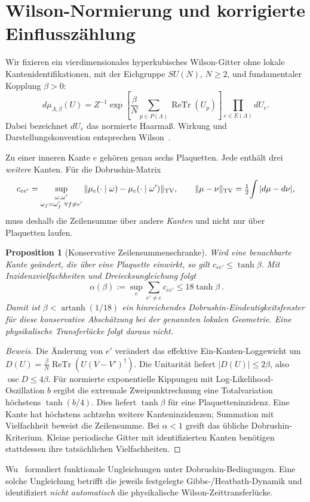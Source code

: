 \documentclass[11pt,a4paper]{article}
\newtheorem{proposition}[theorem]{Proposition}
\theoremstyle{remark}
\begin{document}
\section{Wilson-Normierung und korrigierte Einflusszählung}
Wir fixieren ein vierdimensionales hyperkubisches Wilson-Gitter
ohne lokale Kantenidentifikationen, mit der Eichgruppe
$SU(N)$, $N\ge2$, und fundamentaler Kopplung $\beta>0$:
\[
d\mu_{\Lambda,\beta}(U)=
Z^{-1}\exp\left[
  \frac{\beta}{N}\sum_{p\in P(\Lambda)}
      \operatorname{ReTr}(U_p)
\right]\prod_{e\in E(\Lambda)}dU_e.
\]
Dabei bezeichnet $dU_e$ das normierte Haarmaß.
Wirkung und Darstellungskonvention entsprechen
Wilson~\cite{Wilson}.

Zu einer inneren Kante $e$ gehören genau sechs Plaquetten.
Jede enthält drei \emph{weitere} Kanten.
Für die Dobrushin-Matrix
\[
c_{ee'}=\sup_{\substack{\omega,\omega'\\
\omega_f=\omega'_f\ \forall f\ne e'}}
\|\mu_e(\cdot\mid\omega)-\mu_e(\cdot\mid\omega')\|_{\rm TV},
\qquad
\|\mu-\nu\|_{\rm TV}=\tfrac12\!\int|d\mu-d\nu|,
\]
muss deshalb die Zeilensumme über andere \emph{Kanten}
und nicht nur über Plaquetten laufen.

\begin{proposition}[Konservative Zeilensummenschranke]\label{prop:count}
Wird eine benachbarte Kante geändert, die über eine Plaquette
einwirkt, so gilt $c_{ee'}\le\tanh\beta$.
Mit Inzidenzvielfachheiten und Dreiecksungleichung folgt
\[
\boxed{\ \alpha(\beta):=\sup_e\sum_{e'\ne e}c_{ee'}
\le18\tanh\beta\ }.
\]
Damit ist $\beta<\operatorname{artanh}(1/18)$ ein hinreichendes
\emph{Dobrushin-Eindeutigkeitsfenster} für diese konservative
Abschätzung bei der genannten lokalen Geometrie.
Eine physikalische Transferlücke folgt daraus nicht.
\end{proposition}
\begin{proof}[Beweis]
Die Änderung von $e'$ verändert das effektive
Ein-Kanten-Loggewicht um
$D(U)=\frac{\beta}{N}\operatorname{ReTr}
(U(V-V')^\dagger)$.
Die Unitarität liefert $|D(U)|\le2\beta$,
also $\operatorname{osc}D\le4\beta$.
Für normierte exponentielle Kippungen mit
Log-Likelihood-Oszillation $b$ ergibt die
extremale Zweipunktrechnung eine Totalvariation
höchstens $\tanh(b/4)$.
Dies liefert $\tanh\beta$ für eine Plaquetteninzidenz.
Eine Kante hat höchstens achtzehn weitere
Kanteninzidenzen; Summation mit Vielfachheit
beweist die Zeilensumme.
Bei $\alpha<1$ greift das übliche Dobrushin-Kriterium.
Kleine periodische Gitter mit identifizierten
Kanten benötigen stattdessen ihre tatsächlichen
Vielfachheiten.
\end{proof}
Wu~\cite{Wu} formuliert funktionale Ungleichungen unter
Dobrushin-Bedingungen. Eine solche Ungleichung
betrifft die jeweils festgelegte Gibbs-/Heatbath-Dynamik
und identifiziert \emph{nicht automatisch} die
physikalische Wilson-Zeittransferlücke.
\end{document}
